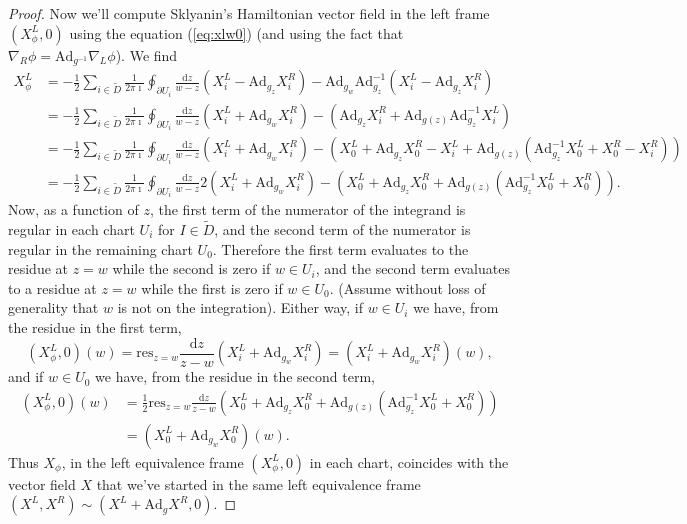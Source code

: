 \documentclass[11pt, oneside, reqno]{amsart}
\theoremstyle{definition} \newtheorem{definition}{Definition}[section]
\theoremstyle{definition} \newtheorem{remark}[definition]{Remark}
\theoremstyle{definition} \newtheorem{remarks}[definition]{Remarks}
\theoremstyle{definition} \newtheorem{question}[definition]{Question}
\theoremstyle{definition} \newtheorem*{note}{Note}
\theoremstyle{definition} \newtheorem{example}[definition]{Example}
\theoremstyle{definition} \newtheorem{examples}[definition]{Examples}
\newcommand{\mr}[1]{\mathrm{#1}}
\renewcommand{\d}{\mathrm{d}}
\newcommand{\Ad}{\mr{Ad}}
\begin{document}
\begin{proof}
Now we'll compute Sklyanin's Hamiltonian vector field in the left frame $(X_{\phi}^{L}, 0)$ using the equation (\ref{eq:xlw0}) (and using the fact that $\nabla_{R} \phi  = \Ad_{g^{-1}} \nabla_{L} \phi$).  We find
\begin{align*}
  X^{L}_\phi &= -\frac 1 2 \sum_{i \in \tilde D} \frac{1}{2 \pi \imath} \oint_{\partial U_i}
  \frac{\d z}{w - z}  (X_i^{L} - \Ad_{g_z} X_i^{R})  - \Ad_{g_w} \Ad_{g_z}^{-1} (X_i^{L} - \Ad_{g_z} X_i^{R}) \\
&=  -\frac 1 2 \sum_{i \in \tilde D} \frac{1}{2 \pi \imath} \oint_{\partial U_i}
\frac{\d z}{w - z}  (X_i^{L}  + \Ad_{g_w} X_i^{R}) - (\Ad_{g_z} X_i^{R} +  \Ad_{g(z)} \Ad_{g_{z}}^{-1} X_i^{L}) \\
 &= -\frac 1 2  \sum_{i \in \tilde D} \frac{1}{2 \pi \imath} \oint_{\partial U_i}
 \frac{\d z}{w - z}  (X_i^{L}  + \Ad_{g_w} X_i^{R}) - (X_0^{L} + \Ad_{g_z} X_0^{R}- X_{i}^{L} +  \Ad_{g(z)} ( \Ad_{g_{z}}^{-1} X_0^{L} + X_0^{R} - X_{i}^{R})) \\
  &= -\frac 1 2  \sum_{i \in \tilde D} \frac{1}{2 \pi \imath} \oint_{\partial U_i}
    \frac{\d z}{w - z} 2 (X_i^{L}  + \Ad_{g_w} X_i^{R}) - (X_0^{L} + \Ad_{g_z} X_0^{R} +  \Ad_{g(z)} ( \Ad_{g_{z}}^{-1} X_0^{L} + X_0^{R} )).
  \end{align*}
Now, as a function of $z$, the first term of the numerator of the integrand is regular in each chart $U_i$ for $I \in \tilde D$, and the second term of the numerator is regular in the remaining chart $U_0$. Therefore the first term evaluates to the residue at $z = w$ while the second is zero if $w \in U_i$, and the second term evaluates to a residue at $z = w$ while the first is zero if $w \in U_0$. (Assume without loss of generality that $w$ is not on the integration).  Either way, if $w \in U_i$ we have, from the residue in the first term,
  \[
    (X^{L}_\phi, 0)(w) = \mathrm{res}_{z = w} \frac{\d z}{ z - w} (X_{i}^{L} + \Ad_{g_w} X_{i}^{R}) =
    (X_{i}^{L} + \Ad_{g_w} X_{i}^{R})(w),
  \]
  and if $ w \in U_0$ we have, from the residue in the second term,
  \begin{align*}
    (X^{L}_\phi, 0)(w) &= \frac 1 2 \mathrm{res}_{z = w} \frac{\d z}{ z - w} (X_0^{L} + \Ad_{g_z} X_0^{R} +  \Ad_{g(z)} ( \Ad_{g_{z}}^{-1} X_0^{L} + X_0^{R} )) \\
    &= ( X_{0}^{L} + \Ad_{g_w} X_{0}^{R})(w).
  \end{align*}
  Thus $X_\phi$, in the left equivalence frame $(X^{L}_{\phi}, 0)$ in each chart, coincides with the vector field $X$ that we've started
  in the same left equivalence frame $(X^{L}, X^{R}) \sim (X^{L} + \Ad_{g} X^{R}, 0)$.
\end{proof}
\end{document}
